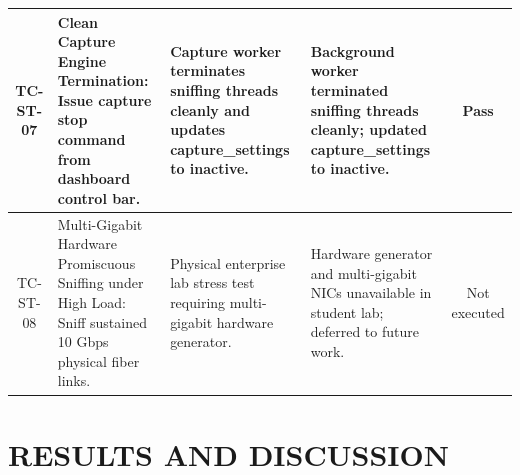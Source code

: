 \documentclass[a4paper,12pt]{report}
\begin{document}
\begin{table}[H]
{\begin{tabular}{|c|p{4.6cm}|p{4.6cm}|p{4.6cm}|c|}
				TC-ST-07 & Clean Capture Engine Termination: Issue capture stop command from dashboard control bar. & Capture worker terminates sniffing threads cleanly and updates capture\_settings to inactive. & Background worker terminated sniffing threads cleanly; updated capture\_settings to inactive. & Pass \\ \hline
				TC-ST-08 & Multi-Gigabit Hardware Promiscuous Sniffing under High Load: Sniff sustained 10 Gbps physical fiber links. & Physical enterprise lab stress test requiring multi-gigabit hardware generator. & Hardware generator and multi-gigabit NICs unavailable in student lab; deferred to future work. & Not executed \\ \hline
			\end{tabular}
		}
	\end{table}
	
	\chapter{RESULTS AND DISCUSSION}
	
\end{document}
